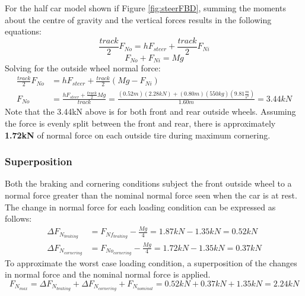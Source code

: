 \documentclass[12pt]{article}
\begin{document}
\noindent For the half car model shown if Figure \ref{fig:steerFBD}, summing the moments about the centre of gravity and the vertical forces results in the following equations: 
\begin{equation}
	\frac{track}{2}F_{No} = hF_{steer} + \frac{track}{2}F_{Ni}
\end{equation}
\begin{equation}
	F_{No} + F_{Ni} = Mg
\end{equation}
Solving for the outside wheel normal force: 
\begin{equation}
\begin{split}
	\frac{track}{2}F_{No} &= hF_{steer} + \frac{track}{2}(Mg - F_{Ni})\\
	F_{No} &= \frac{hF_{steer} + \frac{track}{2}Mg}{track} = \frac{(0.52m)(2.28kN)+(0.80m)(550kg)\left(9.81\frac{m}{s^2}\right)}{1.60m} = 3.44kN
\end{split}
\end{equation}
Note that the 3.44kN above is for both front and rear outside wheels. Assuming the force is evenly split between the front and rear, there is approximately \textbf{1.72kN} of normal force on each outside tire during maximum cornering. 
\subsubsection{Superposition}
Both the braking and cornering conditions subject the front outside wheel to a normal force greater than the nominal normal force seen when the car is at rest. The change in normal force for each loading condition can be expressed as follows: 
\begin{equation}
	\begin{split}
		\Delta F_{N_{braking}} &= F_{Nf_{braking}} - \frac{Mg}{4} =  1.87kN - 1.35kN = 0.52kN\\
		\Delta F_{N_{cornering}} &=  F_{No_{cornering}} - \frac{Mg}{4} =  1.72kN - 1.35kN = 0.37kN
	\end{split}
\end{equation}
To approximate the worst case loading condition, a superposition of the changes in normal force and the nominal normal force is applied. 
\begin{equation}
	F_{N_{max}} = \Delta F_{N_{braking}} + \Delta F_{N_{cornering}} + F_{N_{nominal}} = 0.52kN + 0.37kN + 1.35kN = 2.24kN
\end{equation}
\end{document}
